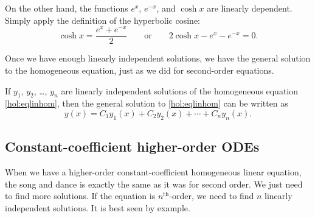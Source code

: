 \begin{example}
On the other hand, the functions $e^x$, $e^{-x}$, and $\cosh x$ are linearly
dependent.  Simply apply the definition of the hyperbolic cosine:
\begin{equation*}
\cosh x = \frac{e^x + e^{-x}}{2} 
\qquad
\text{or}
\qquad
2 \cosh x - e^x - e^{-x} = 0.
\end{equation*}
\end{example}

Once we have enough linearly independent solutions, we have the general
solution to the homogeneous equation, just as we did for second-order
equations.

\begin{theorem}
If $y_1$, $y_2$, \ldots, $y_n$ are linearly independent solutions of the
homogeneous equation \eqref{hol:eqlinhom}, then
the general solution to 
\eqref{hol:eqlinhom} can be written as
\begin{equation*}
y(x) = C_1 y_1(x) + C_2 y_2(x) + \cdots + C_n y_n(x) .
\end{equation*}
\end{theorem}

\subsection{Constant-coefficient higher-order ODEs}

When we have a higher-order constant-coefficient homogeneous linear
equation, the song and dance is exactly the same as it was for second order.
We just need to find more solutions.  If the equation is
$n^{\text{th}}$-order, we need to find $n$ linearly independent solutions.
It is best seen by example.

